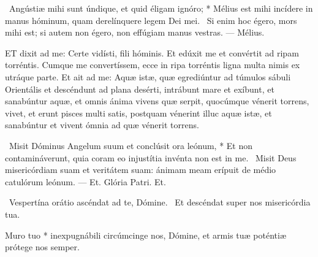\R\ Angústiæ mihi sunt úndique, et quid éligam ignóro; * Mélius est mihi incídere in manus hóminum, quam derelínquere legem Dei mei. \V\ Si enim hoc égero, mors mihi est; si autem non égero, non effúgiam manus vestras. — Mélius.



\lettrine[lines=2]{E}{T} dixit ad me: Certe vidísti, fili hóminis. Et edúxit me et convértit ad ripam torréntis. Cumque me convertíssem, ecce in ripa torréntis ligna multa nimis ex utráque parte. Et ait ad me: Aquæ istæ, quæ egrediúntur ad túmulos sábuli Orientális et descéndunt ad plana desérti, intrábunt mare et exíbunt, et sanabúntur aquæ, et omnis ánima vivens quæ serpit, quocúmque vénerit torrens, vivet, et erunt pisces multi satis, postquam vénerint illuc aquæ istæ, et sanabúntur et vivent ómnia ad quæ vénerit torrens.

\R\ Misit Dóminus Angelum suum et conclúsit ora leónum, * Et non contamináverunt, quia coram eo injustítia invénta non est in me. \V\ Misit Deus misericórdiam suam et veritátem suam: ánimam meam erípuit de médio catulórum leónum. — Et. Glória Patri. Et.


\V\ Vespertína orátio ascéndat ad te, Dómine. \R\ Et descéndat super nos misericórdia tua.

 Muro tuo * inexpugnábili circúmcinge nos, Dómine, et armis tuæ poténtiæ prótege nos semper.



